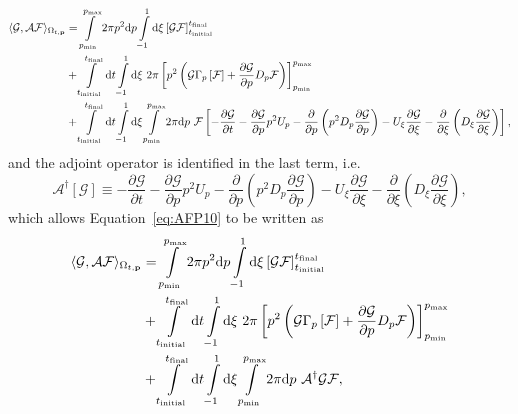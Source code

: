 \documentclass[preprint,aip]{revtex4-2}
\begin{document}
\begin{equation}\label{eq:AFP10}
\begin{aligned}
\langle\mathcal{G,AF}\rangle_{\Omega_{t,\mathbf{p}}} &= \int\displaylimits_{p_\mathrm{min}}^{p_\mathrm{max}}2\pi p^2 \mathrm{d}p
	\int\displaylimits_{-1}^{1}\mathrm{d}\xi \left[\mathcal{GF}\right]_{t_\mathrm{initial}}^{t_\mathrm{final}} \\
	&+ \int\displaylimits_{t_\mathrm{initial}}^{t_\mathrm{final}}\mathrm{d}t
\int\displaylimits_{-1}^{1}\mathrm{d}\xi \ 2\pi
	\left[p^2\left(\mathcal{G}\Gamma_p\left[\mathcal{F}\right] + \frac{\partial\mathcal{G}}{\partial p}D_p\mathcal{F}\right)\right]_{p_\mathrm{min}}^{p_\mathrm{max}} \\
	&+ \int\displaylimits_{t_\mathrm{initial}}^{t_\mathrm{final}}\mathrm{d}t
\int\displaylimits_{-1}^{1}\mathrm{d}\xi
\int\displaylimits_{p_\mathrm{min}}^{p_\mathrm{max}}2\pi \mathrm{d}p \ \mathcal{F} \left[ -\frac{\partial\mathcal{G}}{\partial t} -\frac{\partial\mathcal{G}}{\partial p}p^2U_p - \frac{\partial}{\partial p}\left(p^2D_p\frac{\partial\mathcal{G}}{\partial p}\right) - U_\xi\frac{\partial\mathcal{G}}{\partial\xi} - \frac{\partial}{\partial\xi}\left(D_\xi\frac{\partial\mathcal{G}}{\partial\xi}\right)\right],
\end{aligned}
\end{equation}
and the adjoint operator is identified in the last term, i.e.
\begin{equation}\label{eq:AFP11}
\mathcal{A}^\dagger[\mathcal{G}] \equiv -\frac{\partial\mathcal{G}}{\partial t} -\frac{\partial\mathcal{G}}{\partial p}p^2U_p - \frac{\partial}{\partial p}\left(p^2D_p\frac{\partial\mathcal{G}}{\partial p}\right) - U_\xi\frac{\partial\mathcal{G}}{\partial\xi} - \frac{\partial}{\partial\xi}\left(D_\xi\frac{\partial\mathcal{G}}{\partial\xi}\right),
\end{equation}
which allows Equation~\ref{eq:AFP10} to be written as
\begin{equation}\label{eq:AFP12}
\begin{aligned}
\langle\mathcal{G,AF}\rangle_{\Omega_{t,\mathbf{p}}} &= \int\displaylimits_{p_\mathrm{min}}^{p_\mathrm{max}}2\pi p^2 \mathrm{d}p
	\int\displaylimits_{-1}^{1}\mathrm{d}\xi \left[\mathcal{GF}\right]_{t_\mathrm{initial}}^{t_\mathrm{final}} \\
	&+ \int\displaylimits_{t_\mathrm{initial}}^{t_\mathrm{final}}\mathrm{d}t
\int\displaylimits_{-1}^{1}\mathrm{d}\xi \ 2\pi
	\left[p^2\left(\mathcal{G}\Gamma_p\left[\mathcal{F}\right] + \frac{\partial\mathcal{G}}{\partial p}D_p\mathcal{F}\right)\right]_{p_\mathrm{min}}^{p_\mathrm{max}} \\
	&+ \int\displaylimits_{t_\mathrm{initial}}^{t_\mathrm{final}}\mathrm{d}t
\int\displaylimits_{-1}^{1}\mathrm{d}\xi
\int\displaylimits_{p_\mathrm{min}}^{p_\mathrm{max}}2\pi \mathrm{d}p \ \mathcal{A}^\dagger\mathcal{GF},
\end{aligned}
\end{equation}
\end{document}
